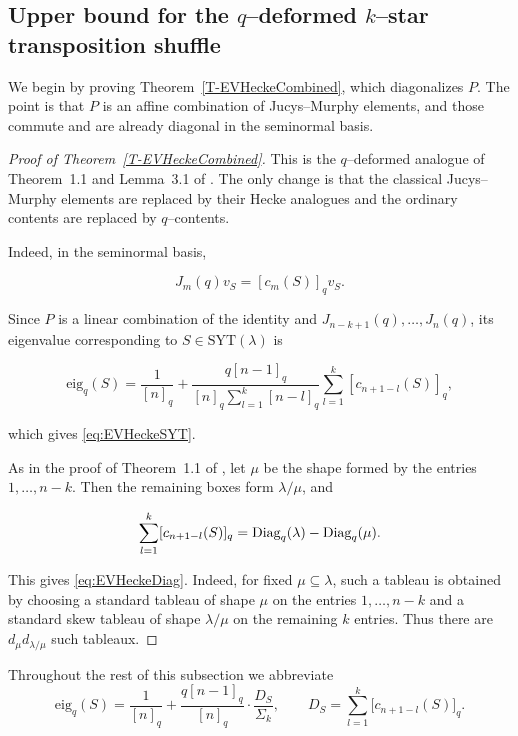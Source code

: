 \documentclass[11pt]{article}
\theoremstyle{plain}  %
\newcommand{\eig}{\text{eig}} %
\begin{document}
\subsection{Upper bound for the \texorpdfstring{$q$--deformed $k$--star}{q-deformed k-star} transposition shuffle}\label{sec:kstar-upper}


We begin by proving Theorem~\ref{T-EVHeckeCombined}, which diagonalizes $P$. The point is
that $P$ is an affine combination of Jucys--Murphy elements, and those commute and are
already diagonal in the seminormal basis.

\begin{proof}[Proof of Theorem~\ref{T-EVHeckeCombined}]
This is the $q$--deformed analogue of Theorem~1.1 and Lemma~3.1 of
\cite{arfaee2025shuffling}. The only change is that the classical
Jucys--Murphy elements are replaced by their Hecke analogues and the ordinary
contents are replaced by $q$--contents.

Indeed, in the seminormal basis,

$$
    J_m(q)v_S=[c_m(S)]_qv_S.
$$

Since $P$ is a linear combination of the identity and
$J_{n-k+1}(q),\ldots,J_n(q)$, its eigenvalue corresponding to
$S\in\mathrm{SYT}(\lambda)$ is

$$
  \eig_q(S)
  = \frac{1}{[n]_q}
    + \frac{q[n-1]_q}{[n]_q\sum_{l=1}^{k}[n-l]_q}
      \sum_{l=1}^{k}[c_{n+1-l}(S)]_q,
$$

which gives \eqref{eq:EVHeckeSYT}.

As in the proof of Theorem~1.1 of \cite{arfaee2025shuffling}, let $\mu$ be the
shape formed by the entries $1,\ldots,n-k$. Then the remaining boxes form
$\lambda/\mu$, and

$$
    \sum_{l=1}^{k}[c_{n+1-l}(S)]_q
    =
    \textup{Diag}_q(\lambda)-\textup{Diag}_q(\mu).
$$

This gives \eqref{eq:EVHeckeDiag}.
Indeed, for fixed $\mu\subseteq\lambda$, such a tableau is obtained
by choosing a standard tableau of shape $\mu$ on the entries
$1,\ldots,n-k$ and a standard skew tableau of shape $\lambda/\mu$
on the remaining $k$ entries. Thus there are
$d_\mu d_{\lambda/\mu}$ such tableaux.
\end{proof}






Throughout the rest of this subsection we abbreviate
$$
  \eig_q(S)
  = \frac{1}{[n]_q} + \frac{q[n-1]_q}{[n]_q}\cdot\frac{D_S}{\Sigma_k},
  \qquad
  D_S = \sum_{l=1}^{k}\bigl[c_{n+1-l}(S)\bigr]_q .
$$
\end{document}
